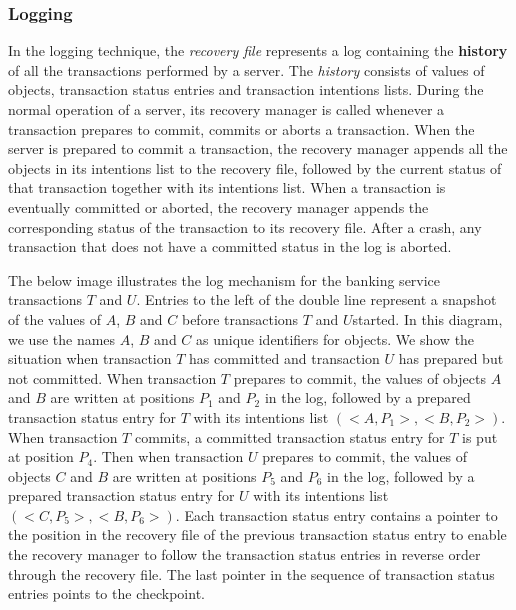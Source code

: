 \subsubsection{Logging}
In the logging technique, the \textit{recovery file} represents a log containing the \textbf{history} of all the transactions performed by a server. The \textit{history} consists of values of objects, transaction status entries and transaction intentions lists. During the normal operation of a server, its recovery manager is called whenever a transaction prepares to commit, commits or aborts a transaction. When the server is prepared to commit a transaction, the recovery manager appends all the objects in its intentions list to the recovery file, followed by the current status of that transaction together with its intentions list. When a transaction is eventually committed or aborted, the recovery manager appends the corresponding status of the transaction to its recovery file. After a crash, any transaction that does not have a committed status in the log is aborted.
\par \bigskip \noindent
The below image illustrates the log mechanism for the banking service transactions $T$
and $U$. Entries to the left of the double line represent a snapshot of the values of $A$, $B$ and $C$ before transactions $T$ and $U$started. In this diagram, we use the names $A$, $B$ and $C$ as unique identifiers for objects.
We show the situation when transaction $T$ has committed and transaction $U$ has prepared
but not committed. When transaction $T$ prepares to commit, the values of objects $A$ and
$B$ are written at positions $P_1$ and $P_2$ in the log, followed by a prepared transaction status entry for $T$ with its intentions list $(< A, P_1 >, < B, P_2 >)$. When transaction $T$ commits, a committed transaction status entry for $T$ is put at position $P_4$. Then when transaction $U$ prepares to commit, the values of objects $C$ and $B$ are written at positions $P_5$ and $P_6$ in the log, followed by a prepared transaction status entry for $U$ with its intentions list $(< C, P_5 >, < B, P_6 >)$. Each transaction status entry contains a pointer to the position in the recovery file of the previous transaction status entry to enable the recovery manager to follow the transaction status entries in reverse order through the recovery file. The last pointer in the sequence of transaction status entries points to the checkpoint.

